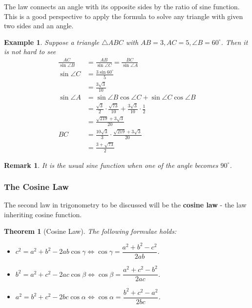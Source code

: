 \documentclass[12pt]{article}
\newtheorem*{theorem}{Theorem}
\newtheorem*{remark}{Remark}
\newtheorem*{example}{Example}
\begin{document}
    The law connects an angle with its opposite sides by the ratio of sine function. This is a good perspective to apply the formula to solve any triangle with given two sides and an angle.

    \begin{example}
        Suppose a triangle $\triangle ABC$ with $AB=3, AC=5, \angle B = 60^\circ$. Then it is not hard to see \begin{align*}
            \frac{AC}{\sin{\angle B}}&=\frac{AB}{\sin{\angle C}}=\frac{BC}{\sin{\angle A}}\\
            \sin{\angle C}&=\frac{3\sin{60^\circ}}{5}\\
            &=\frac{3\sqrt{3}}{10}\\
            \sin{\angle A}&=\sin{\angle B}\cos{\angle C}+\sin{\angle C}\cos{\angle B}\\
            &=\frac{\sqrt{3}}{2}\cdot \frac{\sqrt{73}}{10}+\frac{3\sqrt{3}}{10}\cdot \frac{1}{2}\\
            &=\frac{\sqrt{219}+3\sqrt{3}}{20}\\
            BC&=\frac{10\sqrt{3}}{3}\cdot\frac{\sqrt{219}+3\sqrt{3}}{20}\\
            &=\frac{3+\sqrt{73}}{2}
        \end{align*}
    \end{example}

    \begin{remark}
        It is the usual sine function when one of the angle becomes $90^\circ$.
    \end{remark}

    \subsubsection*{The Cosine Law}

    The second law in trigonometry to be discussed will be the \textbf{cosine law} - the law inheriting cosine function.

    \begin{theorem}[Cosine Law]
        The following formulae holds:\begin{itemize}
            \item $c^2=a^2+b^2-2ab\cos{\gamma} \iff \cos{\gamma}=\dfrac{a^2+b^2-c^2}{2ab}$.
            \item $b^2=a^2+c^2-2ac\cos{\beta} \iff \cos{\beta}=\dfrac{a^2+c^2-b^2}{2ac}$.
            \item $a^2=b^2+c^2-2bc\cos{\alpha} \iff \cos{\alpha}=\dfrac{b^2+c^2-a^2}{2bc}$.
        \end{itemize}
    \end{theorem}
\end{document}
